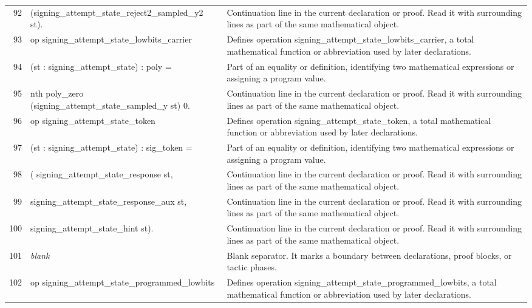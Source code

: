 \documentclass[10pt]{article}
\begin{document}
\begin{longtable}{r L{0.53\textwidth} L{0.37\textwidth}}
92 & {\ttfamily\scriptsize     (signing\_attempt\_state\_reject2\_sampled\_y2 st).} & Continuation line in the current declaration or proof.  Read it with surrounding lines as part of the same mathematical object. \\
93 & {\ttfamily\scriptsize op signing\_attempt\_state\_lowbits\_carrier} & Defines operation signing\_attempt\_state\_lowbits\_carrier, a total mathematical function or abbreviation used by later declarations. \\
94 & {\ttfamily\scriptsize    (st : signing\_attempt\_state) : poly =} & Part of an equality or definition, identifying two mathematical expressions or assigning a program value. \\
95 & {\ttfamily\scriptsize   nth poly\_zero (signing\_attempt\_state\_sampled\_y st) 0.} & Continuation line in the current declaration or proof.  Read it with surrounding lines as part of the same mathematical object. \\
96 & {\ttfamily\scriptsize op signing\_attempt\_state\_token} & Defines operation signing\_attempt\_state\_token, a total mathematical function or abbreviation used by later declarations. \\
97 & {\ttfamily\scriptsize    (st : signing\_attempt\_state) : sig\_token =} & Part of an equality or definition, identifying two mathematical expressions or assigning a program value. \\
98 & {\ttfamily\scriptsize   ( signing\_attempt\_state\_response st,} & Continuation line in the current declaration or proof.  Read it with surrounding lines as part of the same mathematical object. \\
99 & {\ttfamily\scriptsize     signing\_attempt\_state\_response\_aux st,} & Continuation line in the current declaration or proof.  Read it with surrounding lines as part of the same mathematical object. \\
100 & {\ttfamily\scriptsize     signing\_attempt\_state\_hint st).} & Continuation line in the current declaration or proof.  Read it with surrounding lines as part of the same mathematical object. \\
101 & {\ttfamily\scriptsize \emph{blank}} & Blank separator.  It marks a boundary between declarations, proof blocks, or tactic phases. \\
102 & {\ttfamily\scriptsize op signing\_attempt\_state\_programmed\_lowbits} & Defines operation signing\_attempt\_state\_programmed\_lowbits, a total mathematical function or abbreviation used by later declarations. \\

\end{longtable}
\end{document}
